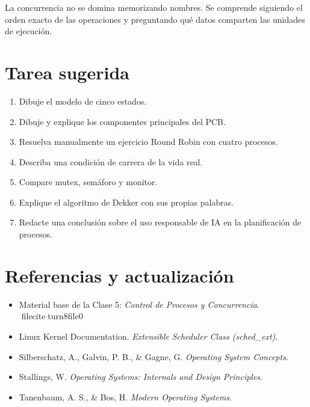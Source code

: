 \documentclass[
  spanish,
  letterpaper,
]{scrbook}
\providecommand{\tightlist}{%
  \setlength{\itemsep}{0pt}\setlength{\parskip}{0pt}}
\begin{document}
\begin{tcolorbox}[enhanced jigsaw, arc=.35mm, bottomrule=.15mm, bottomtitle=1mm, breakable, colback=white, colbacktitle=quarto-callout-tip-color!10!white, colframe=quarto-callout-tip-color-frame, coltitle=black, left=2mm, leftrule=.75mm, opacityback=0, opacitybacktitle=0.6, rightrule=.15mm, title=\textcolor{quarto-callout-tip-color}{\faLightbulb}\hspace{0.5em}{Consejo final del Ingeniero}, titlerule=0mm, toprule=.15mm, toptitle=1mm]

La concurrencia no se domina memorizando nombres. Se comprende siguiendo
el orden exacto de las operaciones y preguntando qué datos comparten las
unidades de ejecución.

\end{tcolorbox}


\chapter{Tarea sugerida}\label{tarea-sugerida-2}

\begin{enumerate}
\def\labelenumi{\arabic{enumi}.}
\tightlist
\item
  Dibuje el modelo de cinco estados.
\item
  Dibuje y explique los componentes principales del PCB.
\item
  Resuelva manualmente un ejercicio Round Robin con cuatro procesos.
\item
  Describa una condición de carrera de la vida real.
\item
  Compare mutex, semáforo y monitor.
\item
  Explique el algoritmo de Dekker con sus propias palabras.
\item
  Redacte una conclusión sobre el uso responsable de IA en la
  planificación de procesos.
\end{enumerate}


\chapter{Referencias y
actualización}\label{referencias-y-actualizaciuxf3n}

\begin{itemize}
\tightlist
\item
  Material base de la Clase 5: \emph{Control de Procesos y
  Concurrencia}. fileciteturn8file0
\item
  Linux Kernel Documentation. \emph{Extensible Scheduler Class
  (sched\_ext)}.
\item
  Silberschatz, A., Galvin, P. B., \& Gagne, G. \emph{Operating System
  Concepts}.
\item
  Stallings, W. \emph{Operating Systems: Internals and Design
  Principles}.
\item
  Tanenbaum, A. S., \& Bos, H. \emph{Modern Operating Systems}.
\end{itemize}
\end{document}
